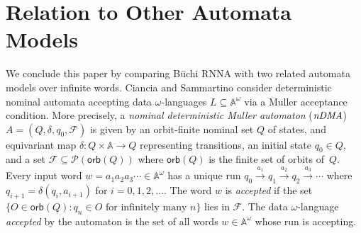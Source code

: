 \documentclass[final,a4paper,UKenglish,thm-restate,autoref,numberwithinsect]{lipics-v2021}
\newcommand{\compr}{:}
\newcommand{\F}{\mathcal{F}}
\numberwithin{equation}{section}
\newcommand{\xto}[1]{\xrightarrow{~#1~}}
\newcommand{\seq}{\subseteq}
\newcommand{\orb}{\mathsf{orb}}
\newcommand{\+}[1]{\mathcal{#1}\xspace}
\newcommand{\Pow}{\mathcal{P}}
\newcommand{\names}{\mathbb{A}}
\theoremstyle{definition}
\begin{document}
\section{Relation to Other Automata Models}\label{sec:relation}
We conclude this paper by comparing Büchi RNNA with two
related automata models over infinite words.  Ciancia and Sammartino
\cite{CianciaSammartino14} consider deterministic nominal automata
accepting data $\omega$-lan\-gu\-ages $L\seq \names^\omega$ via a
Muller acceptance condition. More precisely, a \emph{nominal
  deterministic Muller automaton} ($\emph{nDMA}$)
$A=(Q,\delta,q_0,\F)$ is given by an orbit-finite nominal set $Q$ of
states, and equivariant map $\delta\colon Q\times \names \to Q$
representing transitions, an initial state $q_0\in Q$, and a set
$\F\seq \Pow(\orb(Q))$ where $\orb(Q)$ is the finite set of orbits
of~$Q$. Every input word $w=a_1a_2a_3\cdots \in \names^\omega$ has a
unique run $q_0 \xto{a_1} q_1 \xto{a_2} q_2 \xto{a_3}\cdots $ where
$q_{i+1}=\delta(q_{i},a_{i+1})$ for $i=0,1,2,\ldots$. The word $w$ is
\emph{accepted} if the set $\{ O\in \orb(Q) \compr \text{$q_n\in O$ for
  infinitely many $n$} \}$ lies in $\F$. The data $\omega$-language
\emph{accepted} by the automaton is the set of all words
$w\in \names^\omega$ whose run is accepting.
\end{document}
